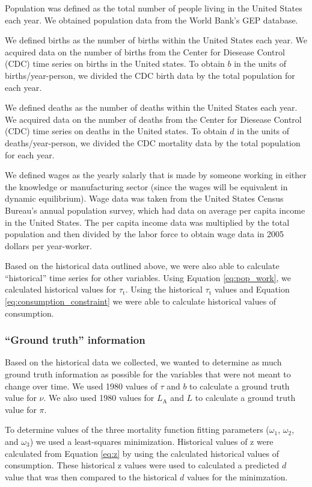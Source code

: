 \documentclass[letterpaper,12pt]{article}
\begin{document}
Population was defined as the total number of people living in the United States each year. We obtained population data from the World Bank's GEP database.

We defined births as the number of births within the United States each year. We acquired data on the number of births from the Center for Diesease Control (CDC) time series on births in the United states. To obtain $b$ in the units of births/year-person, we divided the CDC birth data by the total population for each year.

We defined deaths as the number of deaths within the United States each year. We acquired data on the number of deaths from the Center for Diesease Control (CDC) time series on deaths in the United states. To obtain $d$ in the units of deaths/year-person, we divided the CDC mortality data by the total population for each year.

We defined wages as the yearly salarly that is made by someone working in either the knowledge or manufacturing sector (since the wages will be equivalent in dynamic equilibrium). Wage data was taken from the United States Census Bureau's annual population survey, which had data on average per capita income in the United States. The per capita income data was multiplied by the total population and then divided by the labor force to obtain wage data in 2005 dollars per year-worker.

Based on the historical data outlined above, we were also able to calculate ``historical'' time series for other variables. Using Equation \ref{eq:pop_work}, we calculated historical values for $\tau_\mathrm{t}$. Using the historical $\tau_\mathrm{t}$ values and Equation \ref{eq:consumption_constraint} we were able to calculate historical values of consumption. 

\subsubsection{``Ground truth'' information}
Based on the historical data we collected, we wanted to determine as much ground truth information as possible for the variables that were not meant to change over time. We used 1980 values of $\tau$ and $b$ to calculate a ground truth value for $\nu$. We also used 1980 values for $L_\mathrm{A}$ and $L$ to calculate a ground truth value for $\pi$.

To determine values of the three mortality function fitting parameters ($\omega_\mathrm{1}$, $\omega_\mathrm{2}$, and $\omega_\mathrm{3}$) we used a least-squares minimization. Historical values of z were calculated from Equation \ref{eq:z} by using the calculated historical values of consumption. These historical z values were used to calculated a predicted $d$ value that was then compared to the historical $d$ values for the minimzation. 
\end{document}
